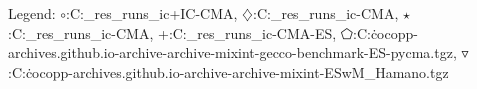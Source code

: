 Legend: {\color{CornflowerBlue}$\circ$}:C:\Users\tristan\Documents\ppsn\BBOB\raw\_res\remaining\_runs\new\_ic\exdata\LB+IC-CMA, {\color{Orange}$\diamondsuit$}:C:\Users\tristan\Documents\ppsn\BBOB\raw\_res\remaining\_runs\new\_ic\exdata\IC-CMA, {\color{Green}$\star$}:C:\Users\tristan\Documents\ppsn\BBOB\raw\_res\remaining\_runs\new\_ic\exdata\LB-CMA, {\color{red}+}:C:\Users\tristan\Documents\ppsn\BBOB\raw\_res\remaining\_runs\new\_ic\exdata\base-CMA-ES, {\color{magenta}$\pentagon$}:C:\Users\tristan\.cocopp\data-archives\numbbo.github.io\data-archive\data-archive\bbob-mixint-gecco-benchmark\CMA-ES-pycma.tgz, {\color{brown}$\triangledown$}:C:\Users\tristan\.cocopp\data-archives\numbbo.github.io\data-archive\data-archive\bbob-mixint\CMA-ESwM\_Hamano.tgz